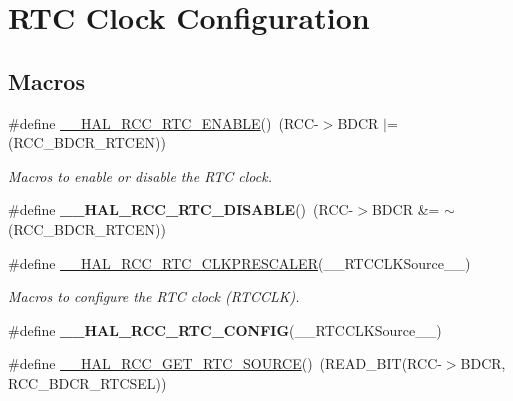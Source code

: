 \hypertarget{group___r_c_c___internal___r_t_c___clock___configuration}{}\section{R\+TC Clock Configuration}
\label{group___r_c_c___internal___r_t_c___clock___configuration}
\subsection*{Macros}
\begin{DoxyCompactItemize}
\item 
\#define \mbox{\hyperlink{group___r_c_c___internal___r_t_c___clock___configuration_gab7cc36427c31da645a0e38e181f8ce0f}{\+\_\+\+\_\+\+H\+A\+L\+\_\+\+R\+C\+C\+\_\+\+R\+T\+C\+\_\+\+E\+N\+A\+B\+LE}}()~(R\+CC-\/$>$B\+D\+CR $\vert$= (R\+C\+C\+\_\+\+B\+D\+C\+R\+\_\+\+R\+T\+C\+EN))
\begin{DoxyCompactList}\small\item\em Macros to enable or disable the R\+TC clock. \end{DoxyCompactList}\item 
\mbox{\label{group___r_c_c___internal___r_t_c___clock___configuration_gaab5eeb81fc9f0c8d4450069f7a751855}} 
\#define {\bfseries \+\_\+\+\_\+\+H\+A\+L\+\_\+\+R\+C\+C\+\_\+\+R\+T\+C\+\_\+\+D\+I\+S\+A\+B\+LE}()~(R\+CC-\/$>$B\+D\+CR \&= $\sim$(R\+C\+C\+\_\+\+B\+D\+C\+R\+\_\+\+R\+T\+C\+EN))
\item 
\#define \mbox{\hyperlink{group___r_c_c___internal___r_t_c___clock___configuration_ga7e10e306e7d9f3cd59d30dcb2c9cf61d}{\+\_\+\+\_\+\+H\+A\+L\+\_\+\+R\+C\+C\+\_\+\+R\+T\+C\+\_\+\+C\+L\+K\+P\+R\+E\+S\+C\+A\+L\+ER}}(\+\_\+\+\_\+\+R\+T\+C\+C\+L\+K\+Source\+\_\+\+\_\+)
\begin{DoxyCompactList}\small\item\em Macros to configure the R\+TC clock (R\+T\+C\+C\+LK). \end{DoxyCompactList}\item 
\#define {\bfseries \+\_\+\+\_\+\+H\+A\+L\+\_\+\+R\+C\+C\+\_\+\+R\+T\+C\+\_\+\+C\+O\+N\+F\+IG}(\+\_\+\+\_\+\+R\+T\+C\+C\+L\+K\+Source\+\_\+\+\_\+)
\item 
\#define \mbox{\hyperlink{group___r_c_c___internal___r_t_c___clock___configuration_gad40d00ff1c984ebd011ea9f6e7f93c44}{\+\_\+\+\_\+\+H\+A\+L\+\_\+\+R\+C\+C\+\_\+\+G\+E\+T\+\_\+\+R\+T\+C\+\_\+\+S\+O\+U\+R\+CE}}()~(R\+E\+A\+D\+\_\+\+B\+IT(R\+CC-\/$>$B\+D\+CR, R\+C\+C\+\_\+\+B\+D\+C\+R\+\_\+\+R\+T\+C\+S\+EL))

\end{DoxyCompactItemize}
